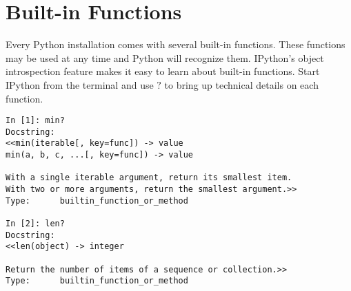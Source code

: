 \label{lab:Standard Library}


\section*{Built-in Functions}

Every Python installation comes with several built-in functions.
These functions may be used at any time and Python will recognize them.
IPython's object introspection feature makes it easy to learn about built-in functions.
Start IPython from the terminal and use $?$ to bring up technical details on each function.

\begin{lstlisting}
In [1]: min?
Docstring:
<<min(iterable[, key=func]) -> value
min(a, b, c, ...[, key=func]) -> value

With a single iterable argument, return its smallest item.
With two or more arguments, return the smallest argument.>>
Type:      builtin_function_or_method

In [2]: len?
Docstring:
<<len(object) -> integer

Return the number of items of a sequence or collection.>>
Type:      builtin_function_or_method
\end{lstlisting}

